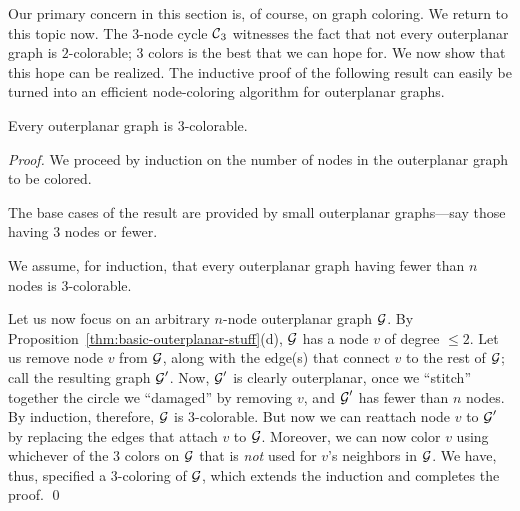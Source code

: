 \bigskip

Our primary concern in this section is, of course, on graph coloring.
We return to this topic now.  The $3$-node cycle $\mbox{$\cal C$}_3$ witnesses the
fact that not every outerplanar graph is $2$-colorable; $3$ colors is
the best that we can hope for.  We now show that this hope can be
realized.  The inductive proof of the following result can easily be
turned into an efficient node-coloring algorithm for outerplanar
graphs.

\begin{prop}
\label{thm:OP-3-colorability}
Every outerplanar graph is $3$-colorable.
\end{prop}

\begin{proof}
We proceed by induction on the number of nodes in the outerplanar
graph to be colored.

The base cases of the result are provided by small outerplanar
graphs---say those having $3$ nodes or fewer.

We assume, for induction, that every outerplanar graph having fewer
than $n$ nodes is $3$-colorable.

Let us now focus on an arbitrary $n$-node outerplanar graph $\mbox{$\cal G$}$.  By
Proposition~\ref{thm:basic-outerplanar-stuff}(d), $\mbox{$\cal G$}$ has a node $v$
of degree $\leq 2$.  Let us remove node $v$ from $\mbox{$\cal G$}$, along with the
edge(s) that connect $v$ to the rest of $\mbox{$\cal G$}$; call the resulting graph
$\mbox{$\cal G$}'$.  Now, $\mbox{$\cal G$}'$ is clearly outerplanar, once we ``stitch'' together
the circle we ``damaged'' by removing $v$, and $\mbox{$\cal G$}'$ has fewer than
$n$ nodes.  By induction, therefore, $\mbox{$\cal G$}$ is $3$-colorable.  But now
we can reattach node $v$ to $\mbox{$\cal G$}'$ by replacing the edges that attach
$v$ to $\mbox{$\cal G$}$.  Moreover, we can now color $v$ using whichever of the
$3$ colors on $\mbox{$\cal G$}$ that is {\em not} used for $v$'s neighbors in $\mbox{$\cal G$}$.
We have, thus, specified a $3$-coloring of $\mbox{$\cal G$}$, which extends the
induction and completes the proof.  \qed
\end{proof}


